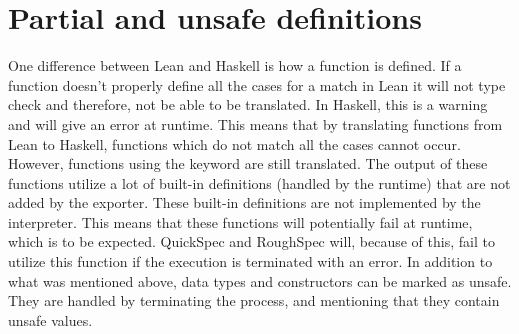 \section{Partial and unsafe definitions}\label{sec:partial-and-unsafe-definitons}
One difference between Lean and Haskell is how a function is defined.
If a function doesn't properly define all the cases for a match in Lean it will not type check and therefore, not be able to be translated.
In Haskell, this is a warning and will give an error at runtime.
This means that by translating functions from Lean to Haskell, functions which do not match all the cases cannot occur.
However, functions using the  keyword are still translated.
The output of these functions utilize a lot of built-in definitions (handled by the runtime) that are not added by the exporter.
These built-in definitions are not implemented by the interpreter.
This means that these functions will potentially fail at runtime, which is to be expected.
QuickSpec and RoughSpec will, because of this, fail to utilize this function if the execution is terminated with an error.
In addition to what was mentioned above, data types and constructors can be marked as unsafe.
They are handled by terminating the process, and mentioning that they contain unsafe values.
